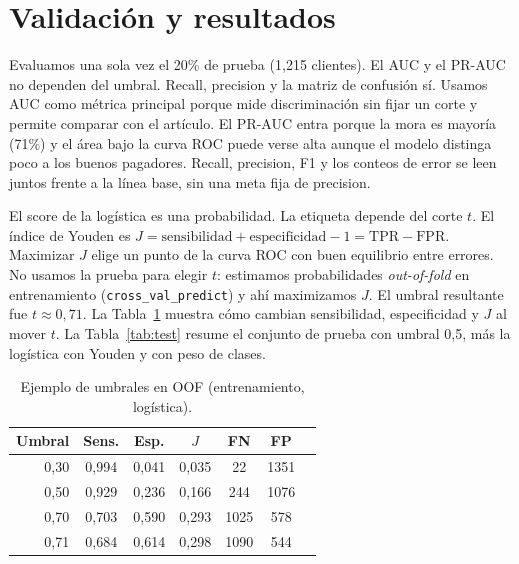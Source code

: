 \documentclass[11pt]{article}
\begin{document}
\section{Validación y resultados}

Evaluamos una sola vez el 20\% de prueba (1{,}215 clientes). El AUC y el PR-AUC no dependen del umbral. Recall, precision y la matriz de confusión sí. Usamos AUC como métrica principal porque mide discriminación sin fijar un corte y permite comparar con el artículo. El PR-AUC entra porque la mora es mayoría (71\%) y el área bajo la curva ROC puede verse alta aunque el modelo distinga poco a los buenos pagadores. Recall, precision, F1 y los conteos de error se leen juntos frente a la línea base, sin una meta fija de precision.

El score de la logística es una probabilidad. La etiqueta depende del corte $t$. El índice de Youden es $J = \text{sensibilidad} + \text{especificidad} - 1 = \mathrm{TPR} - \mathrm{FPR}$. Maximizar $J$ elige un punto de la curva ROC con buen equilibrio entre errores. No usamos la prueba para elegir $t$: estimamos probabilidades \emph{out-of-fold} en entrenamiento (\texttt{cross\_val\_predict}) y ahí maximizamos $J$. El umbral resultante fue $t \approx 0{,}71$. La Tabla~\ref{tab:youden} muestra cómo cambian sensibilidad, especificidad y $J$ al mover $t$. La Tabla~\ref{tab:test} resume el conjunto de prueba con umbral 0,5, más la logística con Youden y con peso de clases.

\begin{table}[H]
\centering
\caption{Ejemplo de umbrales en OOF (entrenamiento, logística).}
\label{tab:youden}
\small
\begin{tabular}{@{}rcccccc@{}}
\toprule
\textbf{Umbral} & \textbf{Sens.} & \textbf{Esp.} & \textbf{$J$} & \textbf{FN} & \textbf{FP} \\
\midrule
0,30 & 0,994 & 0,041 & 0,035 & 22 & 1351 \\
0,50 & 0,929 & 0,236 & 0,166 & 244 & 1076 \\
0,70 & 0,703 & 0,590 & 0,293 & 1025 & 578 \\
0,71 & 0,684 & 0,614 & 0,298 & 1090 & 544 \\
\bottomrule
\end{tabular}
\end{table}
\end{document}

